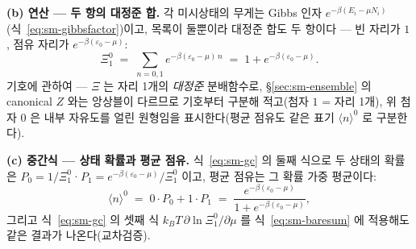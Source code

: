 \textbf{(b) 연산 --- 두 항의 대정준 합.} 각 미시상태의 무게는 Gibbs 인자
$e^{-\beta(E_i-\mu N_i)}$(식~\eqref{eq:sm-gibbsfactor})이고, 목록이 둘뿐이라 대정준 합도 두 항이다 ---
빈 자리가 $1$, 점유 자리가 $e^{-\beta(\varepsilon_0-\mu)}$:
\begin{equation}
\Xi_1^{0}\;=\;\sum_{n=0,1}e^{-\beta(\varepsilon_0-\mu)\,n}
\;=\;1+e^{-\beta(\varepsilon_0-\mu)}.
\label{eq:sm-baresum}
\end{equation}
기호에 관하여 --- $\Xi$ 는 자리 1개의 \emph{대정준} 분배함수로, \S\ref{sec:sm-ensemble} 의 canonical
$Z$ 와는 앙상블이 다르므로 기호부터 구분해 적고(첨자 $1$ = 자리 1개), 위 첨자 $0$ 은 내부 자유도를 얼린
원형임을 표시한다(평균 점유도 같은 표기 $\langle n\rangle^{0}$ 로 구분한다).

\textbf{(c) 중간식 --- 상태 확률과 평균 점유.} 식~\eqref{eq:sm-gc} 의 둘째 식으로 두 상태의 확률은
$P_0=1/\Xi_1^{0}$·$P_1=e^{-\beta(\varepsilon_0-\mu)}/\Xi_1^{0}$ 이고, 평균 점유는 그 확률 가중 평균이다:
\begin{equation}
\langle n\rangle^{0}
\;=\;0\cdot P_0+1\cdot P_1
\;=\;\frac{e^{-\beta(\varepsilon_0-\mu)}}{1+e^{-\beta(\varepsilon_0-\mu)}},
\label{eq:sm-baremid}
\end{equation}
그리고 식~\eqref{eq:sm-gc} 의 셋째 식 $k_BT\,\partial\ln\Xi_1^{0}/\partial\mu$ 를
식~\eqref{eq:sm-baresum} 에 적용해도 같은 결과가 나온다(교차검증).

